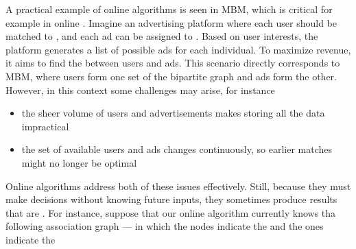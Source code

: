 \documentclass[a4paper, 12pt]{report}
\begin{document}
    A practical example of online algorithms is seen in MBM, which is critical for example in online . Imagine an advertising platform where each user should be matched to , and each ad can be assigned to . Based on user interests, the platform generates a list of possible ads for each individual. To maximize revenue, it aims to find the  between users and ads. This scenario directly corresponds to MBM, where users form one set of the bipartite graph and ads form the other. However, in this context some challenges may arise, for instance

    \begin{itemize}
        \item the sheer volume of users and advertisements makes storing all the data impractical
        \item the set of available users and ads changes continuously, so earlier matches might no longer be optimal
    \end{itemize}

    Online algorithms address both of these issues effectively. Still, because they must make decisions without knowing future inputs, they sometimes produce results that are . For instance, suppose that our online algorithm currently knows tha following association graph --- in which the  nodes indicate the  and the  ones indicate the 

    \begin{figure}[H]
        \centering
    \end{figure}
\end{document}
